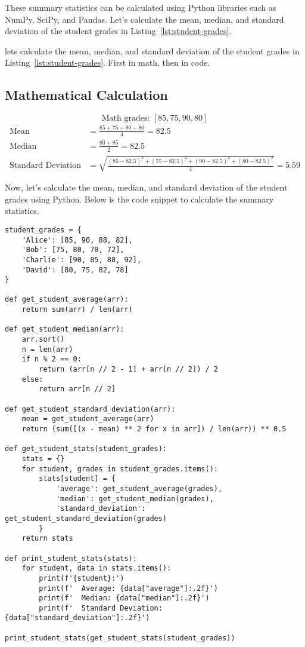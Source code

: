 These summary statistics can be calculated using Python libraries such as NumPy, SciPy, and Pandas. Let's calculate the mean, median, and standard deviation of the student grades in Listing~\ref{lst:student-grades}.

lets calculate the mean, median, and standard deviation of the student grades in Listing~\ref{lst:student-grades}. First in math, then in code.

\subsection{Mathematical Calculation}
\[
\text{Math grades: } [85, 75, 90, 80]
\]
\begin{align*}
\text{Mean} &= \frac{85 + 75 + 90 + 80}{4} = 82.5 \\
\text{Median} &= \frac{80 + 85}{2} = 82.5 \\
\text{Standard Deviation} &= \sqrt{\frac{(85 - 82.5)^2 + (75 - 82.5)^2 + (90 - 82.5)^2 + (80 - 82.5)^2}{4}} = 5.59
\end{align*}

Now, let's calculate the mean, median, and standard deviation of the student grades using Python. Below is the code snippet to calculate the summary statistics.

\begin{lstlisting}[caption={Calculating Summary Statistics in Python}, label={lst:summary-statistics}]
student_grades = {
    'Alice': [85, 90, 88, 82],
    'Bob': [75, 80, 78, 72],
    'Charlie': [90, 85, 88, 92],
    'David': [80, 75, 82, 78]
}

def get_student_average(arr):
    return sum(arr) / len(arr)

def get_student_median(arr):
    arr.sort()
    n = len(arr)
    if n % 2 == 0:
        return (arr[n // 2 - 1] + arr[n // 2]) / 2
    else:
        return arr[n // 2]
    
def get_student_standard_deviation(arr):
    mean = get_student_average(arr)
    return (sum([(x - mean) ** 2 for x in arr]) / len(arr)) ** 0.5

def get_student_stats(student_grades):
    stats = {}
    for student, grades in student_grades.items():
        stats[student] = {
            'average': get_student_average(grades),
            'median': get_student_median(grades),
            'standard_deviation': get_student_standard_deviation(grades)
        }
    return stats

def print_student_stats(stats):
    for student, data in stats.items():
        print(f'{student}:')
        print(f'  Average: {data["average"]:.2f}')
        print(f'  Median: {data["median"]:.2f}')
        print(f'  Standard Deviation: {data["standard_deviation"]:.2f}')

print_student_stats(get_student_stats(student_grades))
\end{lstlisting}

